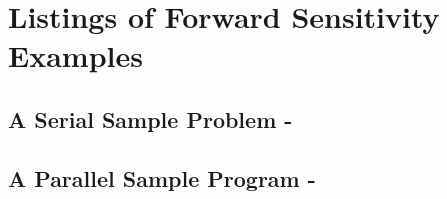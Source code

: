 \section{Listings of {\cvodes} Forward Sensitivity Examples}\label{s:fwd_codes}

\subsection{A Serial Sample Problem - }\label{ss:cvfdx}
{\small}

\newpage
\subsection{A Parallel Sample Program - }\label{ss:pvfkx}
{\small}
